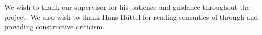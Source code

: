 We wish to thank our supervisor for his patience and guidance throughout
the project. We also wish to thank Hans Hüttel for reading semantics of
\productname{} through and providing constructive criticism.





